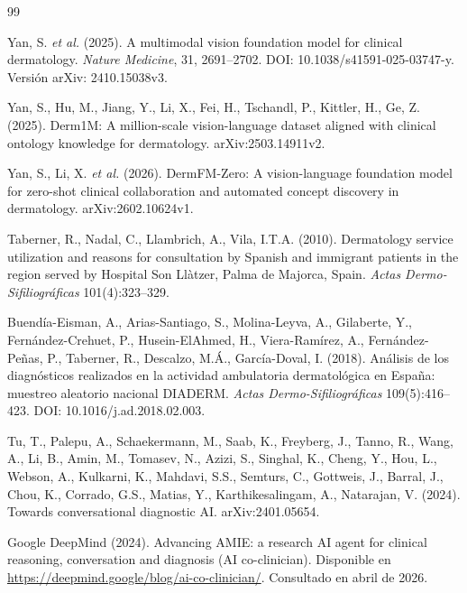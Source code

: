 
\begin{thebibliography}{99}

Yan, S. \emph{et al.} (2025). A multimodal vision foundation model for clinical dermatology. \emph{Nature Medicine}, 31, 2691--2702. DOI: 10.1038/s41591-025-03747-y. Versión arXiv: 2410.15038v3.

Yan, S., Hu, M., Jiang, Y., Li, X., Fei, H., Tschandl, P., Kittler, H., Ge, Z. (2025). Derm1M: A million-scale vision-language dataset aligned with clinical ontology knowledge for dermatology. arXiv:2503.14911v2.

Yan, S., Li, X. \emph{et al.} (2026). DermFM-Zero: A vision-language foundation model for zero-shot clinical collaboration and automated concept discovery in dermatology. arXiv:2602.10624v1.

Taberner, R., Nadal, C., Llambrich, A., Vila, I.T.A. (2010). Dermatology service utilization and reasons for consultation by Spanish and immigrant patients in the region served by Hospital Son Llàtzer, Palma de Majorca, Spain. \emph{Actas Dermo-Sifiliográficas} 101(4):323--329.

Buendía-Eisman, A., Arias-Santiago, S., Molina-Leyva, A., Gilaberte, Y., Fernández-Crehuet, P., Husein-ElAhmed, H., Viera-Ramírez, A., Fernández-Peñas, P., Taberner, R., Descalzo, M.Á., García-Doval, I. (2018). Análisis de los diagnósticos realizados en la actividad ambulatoria dermatológica en España: muestreo aleatorio nacional DIADERM. \emph{Actas Dermo-Sifiliográficas} 109(5):416--423. DOI: 10.1016/j.ad.2018.02.003.

Tu, T., Palepu, A., Schaekermann, M., Saab, K., Freyberg, J., Tanno, R., Wang, A., Li, B., Amin, M., Tomasev, N., Azizi, S., Singhal, K., Cheng, Y., Hou, L., Webson, A., Kulkarni, K., Mahdavi, S.S., Semturs, C., Gottweis, J., Barral, J., Chou, K., Corrado, G.S., Matias, Y., Karthikesalingam, A., Natarajan, V. (2024). Towards conversational diagnostic AI. arXiv:2401.05654.

Google DeepMind (2024). Advancing AMIE: a research AI agent for clinical reasoning, conversation and diagnosis (AI co-clinician). Disponible en \url{https://deepmind.google/blog/ai-co-clinician/}. Consultado en abril de 2026.


\end{thebibliography}
